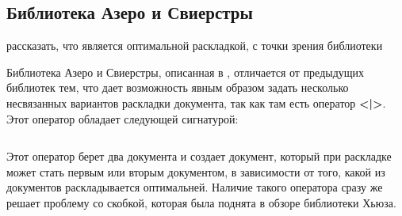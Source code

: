 \subsection{Библиотека Азеро и Свиерстры}

рассказать, что является оптимальной раскладкой, с точки зрения библиотеки

Библиотека Азеро и Свиерстры, описанная в \cite{swierstra}, отличается от предыдущих библиотек тем, что дает возможность явным образом задать несколько несвязанных вариантов раскладки документа, так как там есть оператор \textbf{<|>}. Этот оператор обладает следующей сигнатурой:
\inputminted{haskell}{codes/chooseSw.hs}
Этот оператор берет два документа и создает документ, который при раскладке может стать первым или вторым документом, в зависимости от того, какой из документов раскладывается оптимальней. Наличие такого оператора сразу же решает проблему со скобкой, которая была поднята в обзоре библиотеки Хьюза.